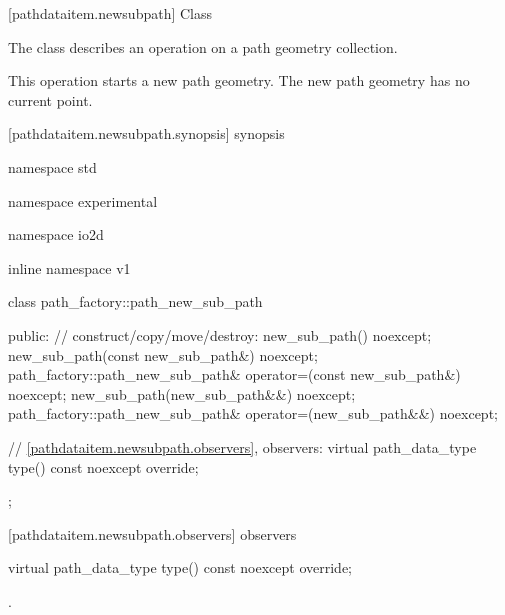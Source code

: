  [pathdataitem.newsubpath] {Class }

\pnum
{}
The class  describes an operation on a path geometry collection.

\pnum
This operation starts a new path geometry. The new path geometry has no current point.

 [pathdataitem.newsubpath.synopsis] { synopsis}

\begin{codeblock}
namespace std { namespace experimental { namespace io2d { inline namespace v1 {
  class path_factory::path_new_sub_path {
  public:
    // construct/copy/move/destroy:
    new_sub_path() noexcept;
    new_sub_path(const new_sub_path&) noexcept;
    path_factory::path_new_sub_path& operator=(const new_sub_path&) noexcept;
    new_sub_path(new_sub_path&&) noexcept;
    path_factory::path_new_sub_path& operator=(new_sub_path&&) noexcept;

    // \ref{pathdataitem.newsubpath.observers}, observers:
    virtual path_data_type type() const noexcept override;
  };
} } } }
\end{codeblock}

 [pathdataitem.newsubpath.observers]{ observers}

\begin{itemdecl}
    virtual path_data_type type() const noexcept override;
\end{itemdecl}
\begin{itemdescr}
	\pnum
	\returns
	.

\end{itemdescr}
